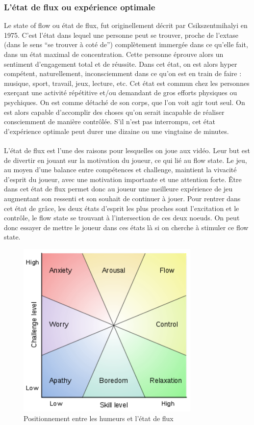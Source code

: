 	\subsubsection{L'état de flux ou expérience optimale}
Le state of flow ou état de flux, fut originellement décrit par Csikszentmihalyi\cite{Csik75} en 1975. C'est l'état dans lequel une personne peut se trouver, proche de l’extase (dans le sens “se trouver à coté de”) complètement immergée dans ce qu'elle fait, dans un état maximal de concentration. Cette personne éprouve alors un sentiment d'engagement total et de réussite. Dans cet état, on est alors hyper compétent, naturellement, inconsciemment dans ce qu’on est en train de faire : musique, sport, travail, jeux, lecture, etc. Cet état est commun chez les personnes exerçant une activité répétitive et/ou demandant de gros efforts physiques ou psychiques. On est comme détaché de son corps, que l’on voit agir tout seul. On est alors capable d’accomplir des choses qu’on serait incapable de réaliser consciemment de manière contrôlée. S’il n’est pas interrompu, cet état d'expérience optimale peut durer une dizaine ou une vingtaine de minutes.

\paragraph{}
L’état de flux est l’une des raisons pour lesquelles on joue aux vidéo. Leur but est de divertir en jouant sur la motivation du joueur, ce qui lié au flow state. Le jeu, au moyen d’une balance entre compétences et challenge, maintient la vivacité d’esprit du joueur, avec une motivation importante et une attention forte. Être dans cet état de flux permet donc au joueur une meilleure expérience de jeu augmentant son ressenti et son souhait de continuer à jouer. Pour rentrer dans cet état de grâce, les deux états d’esprit les plus proches sont l’excitation et le contrôle, le flow state se trouvant à l’intersection de ces deux noeuds. On peut donc essayer de mettre le joueur dans ces états là si on cherche à stimuler ce flow state.

\begin{figure}[h!]
	\centering
	\includegraphics[width=9cm]{images/state_of_flow.png}
	\caption{Positionnement entre les humeurs et l'état de flux}
	\label{state_of_flow}
\end{figure}

